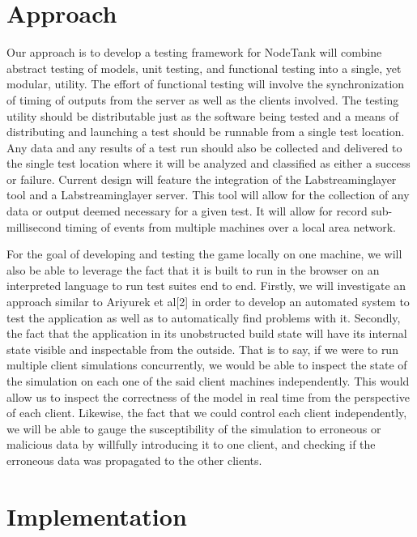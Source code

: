 \documentclass[conference]{IEEEtran}
\begin{document}
\section{Approach}
Our approach is to develop a testing framework for NodeTank will combine abstract testing of models, unit testing, and functional testing into a single, yet modular, 
utility. The effort of functional testing will involve the synchronization of timing of outputs from the server as well as the clients involved. The testing utility 
should be distributable just as the software being tested and a means of distributing and launching a test should be runnable from a single test location. Any data and 
any results of a test run should also be collected and delivered to the single test location where it will be analyzed and classified as either a success or failure. 
Current design will feature the integration of the Labstreaminglayer tool and a Labstreaminglayer server. This tool will allow for the collection of any data or output 
deemed necessary for a given test. It will allow for record sub-millisecond timing of events from multiple machines over a local area network.

For the goal of developing and testing the game locally on one machine, we will also be able to leverage the fact that it is built to run in the browser on
an interpreted language to run test suites end to end. Firstly, we will investigate an approach similar to Ariyurek et al[2] in order to develop an automated 
system to test the application as well as to automatically find problems with it. Secondly, the fact that the application in its unobstructed build state will have
its internal state visible and inspectable from the outside. That is to say, if we were to run multiple client simulations concurrently, we would be able to inspect 
the state of the simulation on each one of the said client machines independently. This would allow us to inspect the correctness of the model in real time from the 
perspective of each client. Likewise, the fact that we could control each client independently, we will be able to gauge the susceptibility of the simulation to erroneous 
or malicious data by willfully introducing it to one client, and checking if the erroneous data was propagated to the other clients.


\section{Implementation}
\end{document}
